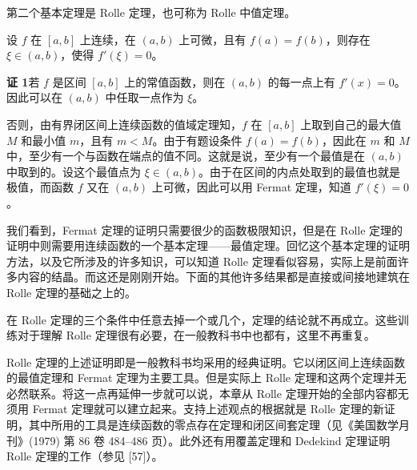 第二个基本定理是 Rolle 定理，也可称为 Rolle 中值定理。

\begin{xproposition}[7.1.3（Rolle 定理）]
设 $f$ 在 $[a,b]$ 上连续，在 $(a,b)$ 上可微，且有 $f(a)=f(b)$，则存在 $\xi\in(a,b)$，使得 $f'(\xi)=0$。
\end{xproposition}
\begin{xproof}
\textbf{证 1}\quad 若 $f$ 是区间 $[a,b]$ 上的常值函数，则在 $(a,b)$ 的每一点上有 $f'(x)=0$。因此可以在 $(a,b)$ 中任取一点作为 $\xi$。

否则，由有界闭区间上连续函数的值域定理知，$f$ 在 $[a,b]$ 上取到自己的最大值 $M$ 和最小值 $m$，且有 $m<M$。由于有题设条件 $f(a)=f(b)$，因此在 $m$ 和 $M$ 中，至少有一个与函数在端点的值不同。这就是说，至少有一个最值是在 $(a,b)$ 中取到的。设这个最值点为 $\xi\in(a,b)$。由于在区间的内点处取到的最值也就是极值，而函数 $f$ 又在 $(a,b)$ 上可微，因此可以用 Fermat 定理，知道 $f'(\xi)=0$。
\end{xproof}

\begin{xremark}
我们看到，Fermat 定理的证明只需要很少的函数极限知识，但是在 Rolle 定理的证明中则需要用连续函数的一个基本定理——最值定理。回忆这个基本定理的证明方法，以及它所涉及的许多知识，可以知道 Rolle 定理看似容易，实际上是前面许多内容的结晶。而这还是刚刚开始。下面的其他许多结果都是直接或间接地建筑在 Rolle 定理的基础之上的。
\end{xremark}

\begin{xremark}
在 Rolle 定理的三个条件中任意去掉一个或几个，定理的结论就不再成立。这些训练对于理解 Rolle 定理很有必要，在一般教科书中也都有，这里不再重复。
\end{xremark}

\begin{xremark}
Rolle 定理的上述证明即是一般教科书均采用的经典证明。它以闭区间上连续函数的最值定理和 Fermat 定理为主要工具。但是实际上 Rolle 定理和这两个定理并无必然联系。将这一点再延伸一步就可以说，本章从 Rolle 定理开始的全部内容都无须用 Fermat 定理就可以建立起来。支持上述观点的根据就是 Rolle 定理的新证明，其中所用的工具是连续函数的零点存在定理和闭区间套定理（见《美国数学月刊》(1979) 第 86 卷 484--486 页）。此外还有用覆盖定理和 Dedekind 定理证明 Rolle 定理的工作（参见 [57]）。
\end{xremark}

